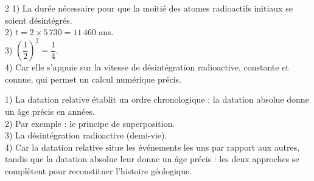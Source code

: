 \begin{multicols}{2}
1) La durée nécessaire pour que la moitié des atomes radioactifs initiaux se soient
désintégrés.\\
2) $t=2\times5\,730=11\,460$ ans.\\
3) $\left(\dfrac12\right)^2=\dfrac14$.\\
4) Car elle s'appuie sur la vitesse de désintégration radioactive, constante et connue,
qui permet un calcul numérique précis.

1) La datation relative établit un ordre chronologique ; la datation absolue donne un
âge précis en années.\\
2) Par exemple : le principe de superposition.\\
3) La désintégration radioactive (demi-vie).\\
4) Car la datation relative situe les événements les uns par rapport aux autres, tandis
que la datation absolue leur donne un âge précis : les deux approches se complètent pour
reconstituer l'histoire géologique.

\end{multicols}
\exercicesBanner
